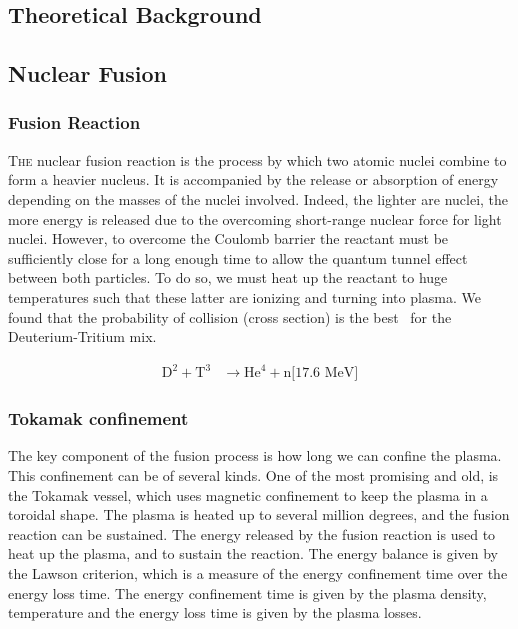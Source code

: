 \documentclass[11pt,a4paper,openany]{report}
\begin{document}
\begin{multicols}{2}
    \chapter{Theoretical Background}

    \section{Nuclear Fusion}
    \subsection{Fusion Reaction}
    \lettrine[lines=2, lhang=.3, nindent=0pt]{\color{black} T}{he} nuclear fusion reaction is the process by which two atomic nuclei combine to form a heavier nucleus. It is accompanied by the release or absorption of energy depending on the masses of the nuclei involved. Indeed, the lighter are nuclei, the  more  energy is released due to the overcoming short-range nuclear force for light nuclei.
    However, to overcome the Coulomb barrier the reactant must be sufficiently close for a long enough time to allow the quantum tunnel effect between both particles. To do so, we must heat up the reactant to huge temperatures such that these latter are ionizing and turning into plasma. We found that the probability of collision (cross section) is the best \ for the Deuterium-Tritium mix.

    \begin{align*}
        \text{D}^2 + \text{T}^3 & \rightarrow \text{He}^4 + \text{n[17.6 MeV]}
    \end{align*}
    \subsection{Tokamak confinement}
    The key component of the fusion process is how long we can confine the plasma. This confinement can be of several kinds. One of the most promising and old, is the Tokamak vessel, which uses magnetic confinement to keep the plasma in a toroidal shape. The plasma is heated up to several million degrees, and the fusion reaction can be sustained. The energy released by the fusion reaction is used to heat up the plasma, and to sustain the reaction. The energy balance is given by the Lawson criterion, which is a measure of the energy confinement time over the energy loss time.
    The energy confinement time is given by the plasma density, temperature and the energy loss time is given by the plasma losses.


\end{multicols}
\end{document}
